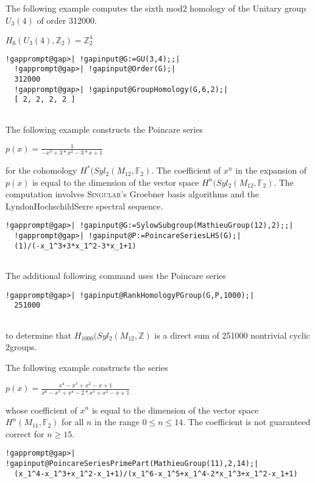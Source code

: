 \documentclass[a4paper,11pt]{report}
\begin{document}
{{{\begin{Verbatim}[commandchars=!@|,fontsize=\small,frame=single,label=Example]
\end{Verbatim}
 

The following example computes the sixth mod\texttt{}$2$ homology of the Unitary group $U_3(4)$ of order 312000. 

$H_6(U_3(4),\mathbb Z_2) = \mathbb Z_2^{4}$ 
\begin{Verbatim}[commandchars=!@|,fontsize=\small,frame=single,label=Example]
  !gapprompt@gap>| !gapinput@G:=GU(3,4);;|
  !gapprompt@gap>| !gapinput@Order(G);|
  312000
  !gapprompt@gap>| !gapinput@GroupHomology(G,6,2);|
  [ 2, 2, 2, 2 ]
  
\end{Verbatim}
 

The following example constructs the Poincare series 

$p(x)=\frac{1}{-x^3+3*x^2-3*x+1}$ 

for the cohomology $H^\ast(Syl_2(M_{12},\mathbb F_2)$. The coefficient of $x^n$ in the expansion of $p(x)$ is equal to the dimension of the vector space $H^n(Syl_2(M_{12},\mathbb F_2)$. The computation involves \textsc{Singular}'s Groebner basis algorithms and the
Lyndon\texttt{}Hochschild\texttt{}Serre spectral
sequence. 
\begin{Verbatim}[commandchars=!@|,fontsize=\small,frame=single,label=Example]
  !gapprompt@gap>| !gapinput@G:=SylowSubgroup(MathieuGroup(12),2);;|
  !gapprompt@gap>| !gapinput@P:=PoincareSeriesLHS(G);|
  (1)/(-x_1^3+3*x_1^2-3*x_1+1)
  
\end{Verbatim}
 The additional following command uses the Poincare series 
\begin{Verbatim}[commandchars=!@|,fontsize=\small,frame=single,label=Example]
  !gapprompt@gap>| !gapinput@RankHomologyPGroup(G,P,1000);|
  251000
  
\end{Verbatim}
 to determine that $H_{1000}(Syl_2(M_{12},\mathbb Z)$ is a direct sum of 251000 non\texttt{}trivial cyclic $2$\texttt{}groups. 

The following example constructs the series 

$p(x)=\frac{x^4-x^3+x^2-x+1}{x^6-x^5+x^4-2*x^3+x^2-x+1}$ 

whose coefficient of $x^n$ is equal to the dimension of the vector space $H^n(M_{11},\mathbb F_2)$ for all $n$ in the range $0\le n\le 14$. The coefficient is not guaranteed correct for $n\ge 15$. 
\begin{Verbatim}[commandchars=!@|,fontsize=\small,frame=single,label=Example]
  !gapprompt@gap>| !gapinput@PoincareSeriesPrimePart(MathieuGroup(11),2,14);|
  (x_1^4-x_1^3+x_1^2-x_1+1)/(x_1^6-x_1^5+x_1^4-2*x_1^3+x_1^2-x_1+1)
  

\end{Verbatim}}}}
\end{document}
